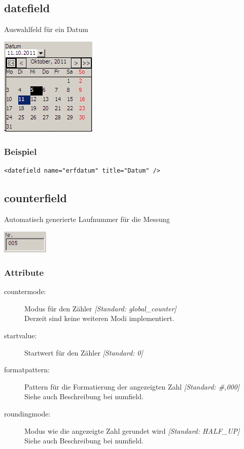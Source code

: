\documentclass[a4paper]{scrartcl}
\begin{document}
\subsection{datefield}
Auswahlfeld für ein Datum
\begin{center}
    \includegraphics[width=4.6cm]{images/datefield.png}
\end{center}
\subsubsection{Beispiel}
\begin{lstlisting}
<datefield name="erfdatum" title="Datum" />
\end{lstlisting}
\subsection{counterfield}
Automatisch generierte Laufnummer für die Messung
\begin{center}
    \includegraphics[width=2.2cm]{images/counterfield.png}
\end{center}

\subsubsection{Attribute}
\begin{description}
    \item[countermode:] Modus für den Zähler \textit{[Standard: global\_counter]}\\
    Derzeit sind keine weiteren Modi implementiert.
    \item[startvalue:] Startwert für den Zähler \textit{[Standard: 0]}
    \item [formatpattern:] Pattern für die Formatierung der angezeigten Zahl  \textit{[Standard: \#,000]}\\
    Siehe auch Beschreibung bei numfield.
    \item [roundingmode:] Modus wie die angezeigte Zahl gerundet wird \textit{[Standard: HALF\_UP]}\\
    Siehe auch Beschreibung bei numfield.
\end{description}
\end{document}
